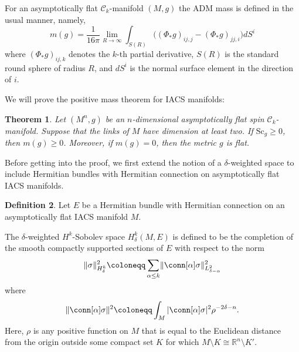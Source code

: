 \documentclass[12pt, reqno]{amsart}
\theoremstyle{plain} %
\newtheorem{theorem}{Theorem}[section]
\theoremstyle{definition}
\newtheorem{definition}[theorem]{Definition}
\theoremstyle{remark}
\numberwithin{equation}{section}
\newcommand{\norm}[1]{\lVert #1 \rVert}
\newcommand{\pnorm}[1]{| #1 |}
\newcommand{\cat}[1]{\mathcal{#1}}
\newcommand{\field}[1]{\mathbb{#1}}
\newcommand{\R}{\field{R}}
\newcommand{\Sc}{\mathrm{Sc}}
\newcommand{\tdim}{n} %
\begin{document}
For an asymptotically flat \(\cat{C}_k\)-manifold \((M,g)\) the ADM mass is defined in the usual manner, namely,
\begin{equation*}
    m(g) = \frac{1}{16\pi}\lim_{R \to \infty} \int_{S(R)} \big( (\Phi_*g)_{ij,j} - (\Phi_*g)_{jj,i} \big) dS^i
\end{equation*}
where \((\Phi_*g)_{ij,k}\) denotes the \(k\)-th partial derivative, \(S(R)\) is the standard round sphere of radius \(R\), and \(dS^i\) is the normal surface element in the direction of \(i\).

We will prove the positive mass theorem for IACS manifolds:
\begin{theorem}\label{thm:positive mass theorem for iterated asymptotically conical spaces}
    Let \((M^\tdim,g)\) be an \(\tdim\)-dimensional asymptotically flat spin \(\cat{C}_k\)-manifold.
    Suppose that the links of \(M\) have dimension at least two.
    If \(\Sc_g \geq 0\), then \(m(g) \geq 0\).
    Moreover, if \(m(g) = 0\), then the metric \(g\) is flat.
\end{theorem}

Before getting into the proof, we first extend the notion of a \(\delta\)-weighted space to include Hermitian bundles with Hermitian connection on asymptotically flat IACS manifolds.
\begin{definition}
    Let \(E\) be a Hermitian bundle with Hermitian connection on an asymptotically flat IACS manifold \(M\).

    The \(\delta\)-weighted \(H^k\)-Sobolev space \(H_\delta^k(M,E)\) is defined to be the completion of the smooth compactly supported sections of \(E\) with respect to the norm
    \begin{equation*}
        \norm{\sigma}_{H_\delta^k}^2 \coloneqq \sum_{\alpha \leq k} \norm{\conn[\alpha] \sigma}_{L_{\delta-\alpha}^2}^2
    \end{equation*}
    where
    \begin{equation*}
        \norm{\conn[\alpha] \sigma}^2 \coloneqq \int_M \pnorm{\conn[\alpha] \sigma}^2 \rho^{-2\delta-n}.
    \end{equation*}
    Here, \(\rho\) is any positive function on \(M\) that is equal to the Euclidean distance from the origin outside some compact set \(K\) for which \(M \setminus K \cong \R^\tdim \setminus K'\).
\end{definition}
\end{document}
